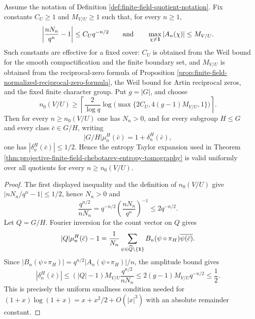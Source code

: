 \begin{lemma}\label{lem:finite-field-admissible-cutoff}
Assume the notation of Definition \ref{def:finite-field-quotient-notation}. Fix constants \(C_U\ge1\) and \(M_{V/U}\ge1\) such that, for every \(n\ge1\),
\[
\left|\frac{nN_n}{q^n}-1\right|\le C_Uq^{-n/2}
\qquad\text{and}\qquad
\max_{\chi\ne\mathbf{1}}|A_n(\chi)|\le M_{V/U}.
\]
Such constants are effective for a fixed cover: \(C_U\) is obtained from the Weil bound for the smooth compactification and the finite boundary set, and \(M_{V/U}\) is obtained from the reciprocal-zero formula of Proposition \ref{prop:finite-field-normalized-reciprocal-zero-formula}, the Weil bound for Artin reciprocal zeros, and the fixed finite character group. Put \(g=|G|\), and choose
\[
n_0(V/U)
\ge
\left\lceil
\frac{2}{\log q}
\log\!\bigl(\max\{2C_U,4(g-1)M_{V/U},1\}\bigr)
\right\rceil .
\]
Then for every \(n\ge n_0(V/U)\) one has \(N_n>0\), and for every subgroup \(H\le G\) and every class \(\bar c\in G/H\), writing
\[
|G/H|\mu_n^H(\bar c)=1+\delta_n^H(\bar c),
\]
one has \(|\delta_n^H(\bar c)|\le1/2\). Hence the entropy Taylor expansion used in Theorem \ref{thm:projective-finite-field-chebotarev-entropy-tomography} is valid uniformly over all quotients for every \(n\ge n_0(V/U)\).
\end{lemma}

\begin{proof}
The first displayed inequality and the definition of \(n_0(V/U)\) give \(|nN_n/q^n-1|\le1/2\), hence \(N_n>0\) and
\[
\frac{q^{n/2}}{nN_n}
=q^{-n/2}\left(\frac{nN_n}{q^n}\right)^{-1}
\le 2q^{-n/2}.
\]
Let \(Q=G/H\). Fourier inversion for the count vector on \(Q\) gives
\[
|Q|\mu_n^H(\bar c)-1
=\frac1{N_n}
\sum_{\psi\in\widehat Q\setminus\{\mathbf{1}\}}
B_n(\psi\circ\pi_H)\overline{\psi(\bar c)}.
\]
Since \(|B_n(\psi\circ\pi_H)|=q^{n/2}|A_n(\psi\circ\pi_H)|/n\), the amplitude bound gives
\[
|\delta_n^H(\bar c)|
\le (|Q|-1)M_{V/U}\frac{q^{n/2}}{nN_n}
\le 2(g-1)M_{V/U}q^{-n/2}
\le\frac12.
\]
This is precisely the uniform smallness condition needed for
\((1+x)\log(1+x)=x+x^2/2+O(|x|^3)\) with an absolute remainder constant.
\end{proof}

